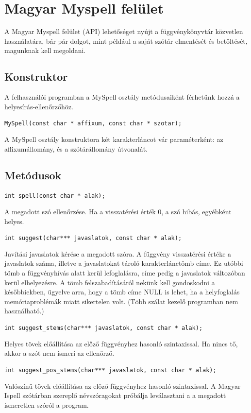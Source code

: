 \section{Magyar Myspell felület}

A Magyar Myspell felület (API) lehetőséget nyújt a
függvénykönyvtár közvetlen használatára, bár
pár dolgot, mint például a saját szótár elmentését
és betöltését, magunknak kell megoldani. 

\subsection{Konstruktor}

A felhasználói programban a MySpell osztály
metódusaiként férhetünk hozzá a helyesírás-ellenőrzőhöz.

\noindent\verb+MySpell(const char * affixum, const char * szotar);+

A MySpell osztály konstruktora két karakterláncot vár paraméterként:
az affixumállomány, és a szótárállomány útvonalát.

\subsection{Metódusok}

\noindent\verb+int spell(const char * alak);+

A megadott szó ellenőrzése. Ha a visszatérési érték 0, a szó
hibás, egyébként helyes.

\noindent\verb+int suggest(char*** javaslatok, const char * alak);+

Javítási javaslatok kérése a megadott szóra. A függvény visszatérési értéke
a javaslatok száma, illetve a javaslatokat tároló
karakterlánctömb címe. Ez utóbbi tömb a függvényhívás alatt
kerül lefoglalásra, címe pedig a javaslatok változóban kerül
elhelyezésre. A tömb felszabadításáról nekünk kell gondoskodni
a későbbiekben, ügyelve arra, hogy a tömb címe NULL is lehet,
ha a helyfoglalás memóriaproblémák miatt sikertelen volt.
(Több szálat kezelő programban nem használható.)

\noindent\verb+int suggest_stems(char*** javaslatok, const char * alak);+

Helyes tövek előállítása az előző függvényhez hasonló szintaxissal.
Ha nincs tő, akkor a szót nem ismeri az ellenőrző.

\noindent\verb+int suggest_pos_stems(char*** javaslatok, const char * alak);+

Valószínű tövek előállítása az előző függvényhez hasonló szintaxissal.
A Magyar Ispell szótárban szereplő névszóragokat próbálja leválasztani a
a megadott ismeretlen szóról a program.

